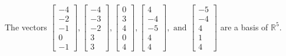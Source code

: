 \begin{exercise}
\begin{exerciseStatement}
  \end{exerciseStatement}
  \begin{exerciseAnswer}
   The vectors \(\left[\begin{array}{r}
-4 \\
-2 \\
-1 \\
0 \\
-1
\end{array}\right] , \left[\begin{array}{r}
-4 \\
-3 \\
-2 \\
3 \\
3
\end{array}\right] , \left[\begin{array}{r}
0 \\
3 \\
4 \\
0 \\
4
\end{array}\right] , \left[\begin{array}{r}
4 \\
-4 \\
-5 \\
4 \\
4
\end{array}\right] , \text{ and } \left[\begin{array}{r}
-5 \\
-4 \\
4 \\
1 \\
4
\end{array}\right]\) 
  	 are  a basis of \(\mathbb{R}^5\).
  


  \end{exerciseAnswer}
\end{exercise}